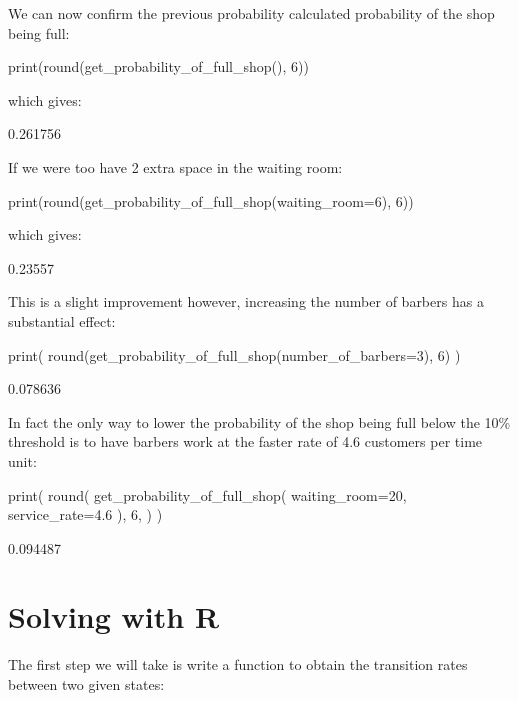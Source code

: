 We can now confirm the previous probability calculated probability of the shop
being full:

\begin{pyin}
print(round(get_probability_of_full_shop(), 6))
\end{pyin}

which gives:

\begin{pyout}
0.261756
\end{pyout}

If we were too have 2 extra space in the waiting room:

\begin{pyin}
print(round(get_probability_of_full_shop(waiting_room=6), 6))
\end{pyin}

which gives:

\begin{pyout}
0.23557
\end{pyout}

This is a slight improvement however, increasing the number of barbers has a
substantial effect:

\begin{pyin}
print(
    round(get_probability_of_full_shop(number_of_barbers=3), 6)
)
\end{pyin}

\begin{pyout}
0.078636
\end{pyout}

In fact the only way to lower the probability of the shop being full below the
10\% threshold is to have barbers work at the faster rate of 4.6 customers per
time unit:

\begin{pyin}
print(
    round(
        get_probability_of_full_shop(
            waiting_room=20, service_rate=4.6
        ),
        6,
    )
)
\end{pyin}

\begin{pyout}
0.094487
\end{pyout}


\section{Solving with R}\label{sec:solving-with-R}

The first step we will take is write a function to obtain the transition rates
between two given states:

